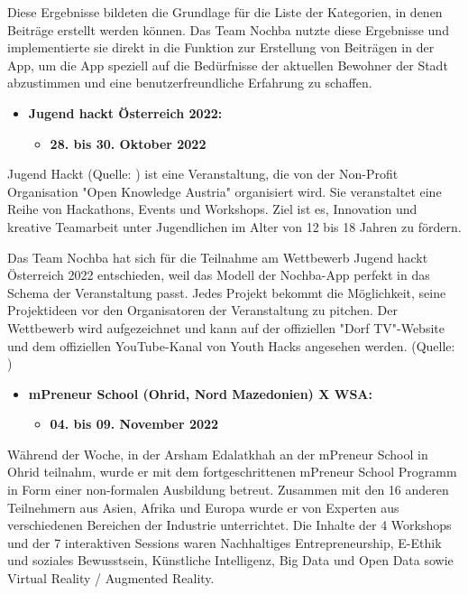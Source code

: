 Diese Ergebnisse bildeten die Grundlage für die Liste der Kategorien, in denen Beiträge erstellt werden können. Das Team Nochba nutzte diese Ergebnisse und implementierte sie direkt in die Funktion zur Erstellung von Beiträgen in der App, um die App speziell auf die Bedürfnisse der aktuellen Bewohner der Stadt abzustimmen und eine benutzerfreundliche Erfahrung zu schaffen.

\begin{itemize}
    \item \textbf{Jugend hackt Österreich 2022:}
    \begin{itemize}
        \item \textbf{28. bis 30. Oktober 2022}
    \end{itemize}
\end{itemize}

Jugend Hackt (Quelle: ) ist eine Veranstaltung, die von der Non-Profit Organisation "Open Knowledge Austria" organisiert wird. Sie veranstaltet eine Reihe von Hackathons, Events und Workshops. Ziel ist es, Innovation und kreative Teamarbeit unter Jugendlichen im Alter von 12 bis 18 Jahren zu fördern. 

Das Team Nochba hat sich für die Teilnahme am Wettbewerb Jugend hackt Österreich 2022 entschieden, weil das Modell der Nochba-App perfekt in das Schema der Veranstaltung passt. Jedes Projekt bekommt die Möglichkeit, seine Projektideen vor den Organisatoren der Veranstaltung zu pitchen. Der Wettbewerb wird aufgezeichnet und kann auf der offiziellen "Dorf TV"-Website und dem offiziellen YouTube-Kanal von Youth Hacks angesehen werden. (Quelle: )

\begin{itemize}
    \item \textbf{mPreneur School (Ohrid, Nord Mazedonien) X WSA:}
    \begin{itemize}
        \item \textbf{04. bis 09. November 2022}
    \end{itemize}
\end{itemize}

Während der Woche, in der Arsham Edalatkhah an der mPreneur School in Ohrid teilnahm, wurde er mit dem fortgeschrittenen mPreneur School Programm in Form einer non-formalen Ausbildung betreut. Zusammen mit den 16 anderen Teilnehmern aus Asien, Afrika und Europa wurde er von Experten aus verschiedenen Bereichen der Industrie unterrichtet. Die Inhalte der 4 Workshops und der 7 interaktiven Sessions waren Nachhaltiges Entrepreneurship, E-Ethik und soziales Bewusstsein, Künstliche Intelligenz, Big Data und Open Data sowie Virtual Reality / Augmented Reality.

